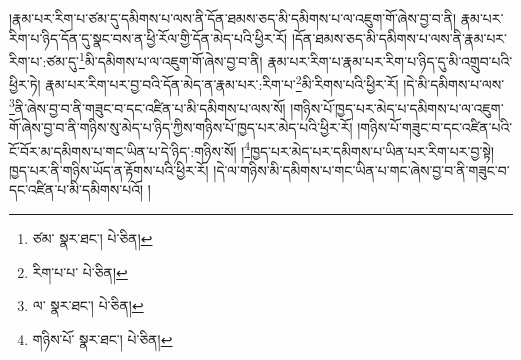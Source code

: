 །རྣམ་པར་རིག་པ་ཙམ་དུ་དམིགས་པ་ལས་ནི་དོན་ཐམས་ཅད་མི་དམིགས་པ་ལ་འཇུག་གོ་ཞེས་བྱ་བ་ནི། རྣམ་པར་རིག་པ་ཉིད་དོན་དུ་སྣང་བས་ན་ཕྱི་རོལ་གྱི་དོན་མེད་པའི་ཕྱིར་རོ། །དོན་ཐམས་ཅད་མི་དམིགས་པ་ལས་ནི་རྣམ་པར་རིག་པ་:ཙམ་དུ་\footnote{ཙམ་  སྣར་ཐང་།  པེ་ཅིན། }མི་དམིགས་པ་ལ་འཇུག་གོ་ཞེས་བྱ་བ་ནི། རྣམ་པར་རིག་པ་རྣམ་པར་རིག་པ་ཉིད་དུ་མི་འགྲུབ་པའི་ཕྱིར་ཏེ། རྣམ་པར་རིག་པར་བྱ་བའི་དོན་མེད་ན་རྣམ་པར་:རིག་པ་\footnote{རིག་པ་པ་  པེ་ཅིན། }མི་རིགས་པའི་ཕྱིར་རོ། །དེ་མི་དམིགས་པ་ལས་\footnote{ལ་  སྣར་ཐང་།  པེ་ཅིན། }ནི་ཞེས་བྱ་བ་ནི་གཟུང་བ་དང་འཛིན་པ་མི་དམིགས་པ་ལས་སོ། །གཉིས་པོ་ཁྱད་པར་མེད་པ་དམིགས་པ་ལ་འཇུག་གོ་ཞེས་བྱ་བ་ནི་གཉིས་སུ་མེད་པ་ཉིད་ཀྱིས་གཉིས་པོ་ཁྱད་པར་མེད་པའི་ཕྱིར་རོ། །གཉིས་པོ་གཟུང་བ་དང་འཛིན་པའི་ངོ་བོར་མ་དམིགས་པ་གང་ཡིན་པ་དེ་ཉིད་:གཉིས་སོ། །\footnote{གཉིས་པོ་  སྣར་ཐང་།  པེ་ཅིན། }ཁྱད་པར་མེད་པར་དམིགས་པ་ཡིན་པར་རིག་པར་བྱ་སྟེ། ཁྱད་པར་ནི་གཉིས་ཡོད་ན་རྟོགས་པའི་ཕྱིར་རོ། །དེ་ལ་གཉིས་མི་དམིགས་པ་གང་ཡིན་པ་གང་ཞེས་བྱ་བ་ནི་གཟུང་བ་དང་འཛིན་པ་མི་དམིགས་པའོ། །
